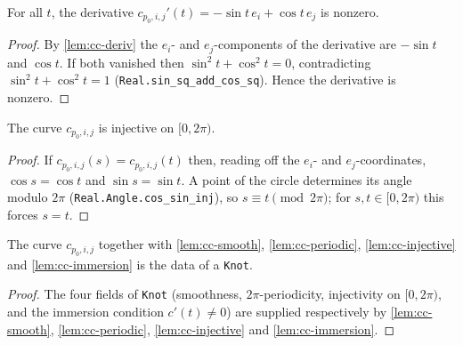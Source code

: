 \begin{lemma}
    \label{lem:cc-immersion}
    For all $t$, the derivative $c_{p_0,i,j}'(t) = -\sin t\, e_i + \cos t\, e_j$
    is nonzero.
\end{lemma}
\begin{proof}
    By \cref{lem:cc-deriv} the $e_i$- and $e_j$-components of the derivative are
    $-\sin t$ and $\cos t$. If both vanished then $\sin^2 t + \cos^2 t = 0$,
    contradicting $\sin^2 t + \cos^2 t = 1$ (\texttt{Real.sin\_sq\_add\_cos\_sq}).
    Hence the derivative is nonzero.
\end{proof}

\begin{lemma}
    \label{lem:cc-injective}
    The curve $c_{p_0,i,j}$ is injective on $[0,2\pi)$.
\end{lemma}
\begin{proof}
    If $c_{p_0,i,j}(s) = c_{p_0,i,j}(t)$ then, reading off the $e_i$- and
    $e_j$-coordinates, $\cos s = \cos t$ and $\sin s = \sin t$. A point of the
    circle determines its angle modulo $2\pi$ (\texttt{Real.Angle.cos\_sin\_inj}),
    so $s \equiv t \pmod{2\pi}$; for $s,t\in[0,2\pi)$ this forces $s = t$.
\end{proof}

\begin{lemma}
    \label{lem:coordinate-circle-knot}
    The curve $c_{p_0,i,j}$ together with \cref{lem:cc-smooth},
    \cref{lem:cc-periodic}, \cref{lem:cc-injective} and \cref{lem:cc-immersion}
    is the data of a \texttt{Knot}.
\end{lemma}
\begin{proof}
    The four fields of \texttt{Knot} (smoothness, $2\pi$-periodicity, injectivity
    on $[0,2\pi)$, and the immersion condition $c'(t)\neq 0$) are supplied
    respectively by \cref{lem:cc-smooth}, \cref{lem:cc-periodic},
    \cref{lem:cc-injective} and \cref{lem:cc-immersion}.
\end{proof}

